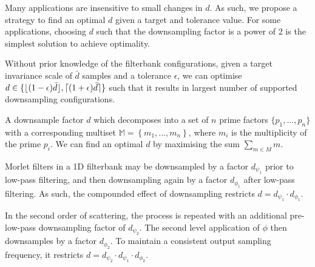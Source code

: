 \documentclass[journal]{IEEEtran}
\DeclarePairedDelimiter\ceil{\lceil}{\rceil}
\DeclarePairedDelimiter\floor{\lfloor}{\rfloor}
\begin{document}


Many applications are insensitive to small changes in $d$. As such, we propose a strategy to find an optimal $d$ given a target and tolerance value. For some applications, choosing $d$ such that the downsampling factor is a power of 2 is the simplest solution to achieve optimality. 

Without prior knowledge of the filterbank configurations, given a target invariance scale of $\bar{d}$ samples and a tolerance $\epsilon$, we can optimise $d \in \{\floor{(1 - \epsilon)\bar{d}}, \ceil{(1 + \epsilon)\bar{d}}\}$ such that it results in largest number of supported downsampling configurations.

A downsample factor $d$ which decomposes into a set of $n$ prime factors $\{p_1, ..., p_n\}$ with a corresponding multiset $\mathbb{M} = \left\{ m_1, ..., m_n \right\}$, where $m_i$ is the multiplicity of the prime $p_i$. We can find an optimal $d$ by maximising the sum $\sum\limits_{m \in M} m$.


Morlet filters in a 1D filterbank may be downsampled by a factor $d_{\psi_1}$ prior to low-pass filtering, and then downsampling again by a factor $d_{\phi_1}$ after low-pass filtering. As such, the compounded effect of downsampling restricts $d = d_{\psi_1} \cdot d_{\phi_1}$.

In the second order of scattering, the process is repeated with an additional pre-low-pass downsampling factor of $d_{\psi_2}$. The second level application of $\phi$ then downsamples by a factor $d_{\phi_2}$. To maintain a consistent output sampling frequency, it restricts $d = d_{\psi_2} \cdot d_{\psi_1} \cdot d_{\phi_2}$. 
\end{document}
